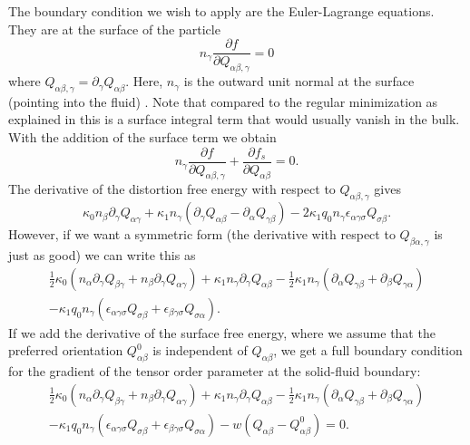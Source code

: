 The boundary condition we wish to apply are the Euler-Lagrange equations. 
They are at the surface of the particle
\begin{equation}
n_\gamma \frac{\partial f}{\partial Q_{\alpha\beta,\gamma}} = 0
\end{equation}
where $Q_{\alpha\beta,\gamma} = \partial_\gamma Q_{\alpha\beta}$. Here,
$n_\gamma$ is the outward unit normal at the surface (pointing into the
fluid) \cite{skarabot}. Note that compared to the regular minimization as  
explained in \cite{wright} this is a surface integral term that would 
usually vanish in the bulk.
With the
addition of the surface term we obtain
\begin{equation}
n_\gamma \frac{\partial f}{\partial Q_{\alpha\beta,\gamma}}
+ \frac{\partial f_s}{\partial Q_{\alpha\beta}} = 0.
\end{equation}
The derivative of the distortion free energy with respect to
$Q_{\alpha\beta,\gamma}$ gives
\begin{equation}
\kappa_0 n_\beta \partial_\gamma Q_{\alpha\gamma}
+ \kappa_1 n_\gamma
(\partial_\gamma Q_{\alpha\beta} - \partial_\alpha Q_{\gamma\beta})
- 2\kappa_1 q_0 n_\gamma \epsilon_{\alpha\gamma\sigma} Q_{\sigma\beta}.
\end{equation}
However, if we want a symmetric form (the derivative with respect to
$Q_{\beta\alpha,\gamma}$ is just as good) we can write this as
\begin{eqnarray}
{\textstyle\frac{1}{2}} \kappa_0 (n_\alpha \partial_\gamma Q_{\beta\gamma}
+ n_\beta \partial_\gamma Q_{\alpha\gamma})
+ \kappa_1 n_\gamma \partial_\gamma Q_{\alpha\beta}
- {\textstyle\frac{1}{2}} \kappa_1 n_\gamma ( \partial_\alpha Q_{\gamma\beta}
+ \partial_\beta Q_{\gamma\alpha})
\nonumber
\\
- \kappa_1 q_0 n_\gamma (\epsilon_{\alpha\gamma\sigma} Q_{\sigma\beta}
+ \epsilon_{\beta\gamma\sigma}Q_{\sigma\alpha}).
\end{eqnarray}
If we add the derivative of the surface free energy,
where we assume that the preferred orientation $Q_{\alpha\beta}^0$ is
independent of $Q_{\alpha\beta}$, we get a full boundary condition
for the gradient of the tensor order parameter at the solid-fluid boundary:
\begin{eqnarray}
{\textstyle\frac{1}{2}} \kappa_0 (n_\alpha \partial_\gamma Q_{\beta\gamma}
+ n_\beta \partial_\gamma Q_{\alpha\gamma})
+ \kappa_1 n_\gamma \partial_\gamma Q_{\alpha\beta}
- {\textstyle\frac{1}{2}} \kappa_1 n_\gamma ( \partial_\alpha Q_{\gamma\beta}
+ \partial_\beta Q_{\gamma\alpha})
\nonumber
\\
- \kappa_1 q_0 n_\gamma (\epsilon_{\alpha\gamma\sigma} Q_{\sigma\beta}
+ \epsilon_{\beta\gamma\sigma}Q_{\sigma\alpha})
- w(Q_{\alpha\beta} - Q_{\alpha\beta}^0) = 0.
\label{cholesteric_bc}
\end{eqnarray}

